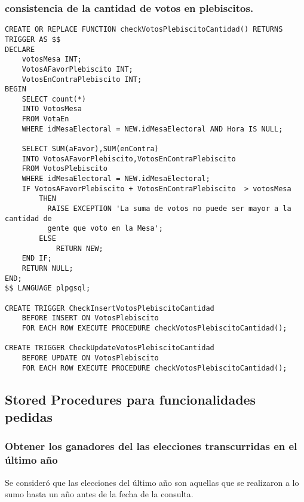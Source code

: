 \subsubsection{consistencia de la cantidad de votos en plebiscitos.}
\begin{verbatim}
CREATE OR REPLACE FUNCTION checkVotosPlebiscitoCantidad() RETURNS TRIGGER AS $$
DECLARE
    votosMesa INT;
    VotosAFavorPlebiscito INT; 
    VotosEnContraPlebiscito INT;
BEGIN
    SELECT count(*) 
    INTO VotosMesa 
    FROM VotaEn 
    WHERE idMesaElectoral = NEW.idMesaElectoral AND Hora IS NULL;
    
    SELECT SUM(aFavor),SUM(enContra) 
    INTO VotosAFavorPlebiscito,VotosEnContraPlebiscito 
    FROM VotosPlebiscito 
    WHERE idMesaElectoral = NEW.idMesaElectoral;
    IF VotosAFavorPlebiscito + VotosEnContraPlebiscito  > votosMesa 
        THEN
          RAISE EXCEPTION 'La suma de votos no puede ser mayor a la cantidad de 
          gente que voto en la Mesa';
        ELSE
            RETURN NEW;
    END IF;
    RETURN NULL;
END;
$$ LANGUAGE plpgsql;

CREATE TRIGGER CheckInsertVotosPlebiscitoCantidad
    BEFORE INSERT ON VotosPlebiscito
    FOR EACH ROW EXECUTE PROCEDURE checkVotosPlebiscitoCantidad();

CREATE TRIGGER CheckUpdateVotosPlebiscitoCantidad
    BEFORE UPDATE ON VotosPlebiscito
    FOR EACH ROW EXECUTE PROCEDURE checkVotosPlebiscitoCantidad();
\end{verbatim}
\newpage

\subsection{Stored Procedures para funcionalidades pedidas}

\subsubsection{Obtener los ganadores del las elecciones transcurridas en el último año}

\indent Se consideró que las elecciones del último año son aquellas que se realizaron a lo sumo hasta un año antes de la fecha de la consulta.\\

